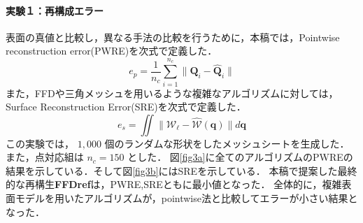 \documentclass[10.5pt,twocolumn,a4j,fleqn]{ujarticle}
\def\figref#1{図\ref{#1}}
\begin{document}
\paragraph{実験１：再構成エラー}
表面の真値と比較し，異なる手法の比較を行うために，本稿では，Pointwise reconstruction error(PWRE)を次式で定義した．
\begin{equation}
    e_p = \frac{1}{n_c} \sum_{i=1}^{n_c}  \| \bm{Q}_i - \hat{\bm{Q}}_i\|
\end{equation}
また，FFDや三角メッシュを用いるような複雑なアルゴリズムに対しては，Surface Reconstruction Error(SRE)を次式で定義した．
\begin{equation}
    e_s =  \iint \| \mathcal{W}_{\bm{\ell}} - \hat{\mathcal{W}}(\bm{q}) \| d\bm{q}
\end{equation}
この実験では， $1,000$ 個のランダムな形状をしたメッシュシートを生成した．また，点対応組は $n_c = 150$ とした．
\figref{fig3a}に全てのアルゴリズムのPWREの結果を示している．そして\figref{fig3b}にはSREを示している．
本稿で提案した最終的な再構生{\bf FFDref}は，PWRE,SREともに最小値となった．
全体的に，複雑表面モデルを用いたアルゴリズムが，pointwise法と比較してエラーが小さい結果となった．
\end{document}
